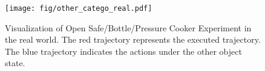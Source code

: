 \begin{figure}[tb]
  \centering
  \texttt{[image: fig/other\_catego\_real.pdf]}
  \caption{Visualization of Open Safe/Bottle/Pressure Cooker Experiment in the real world. The red trajectory represents the executed trajectory. The blue trajectory indicates the actions under the other object state.
  }
  \label{fig:fig1}
\vspace{-4mm}
\end{figure}